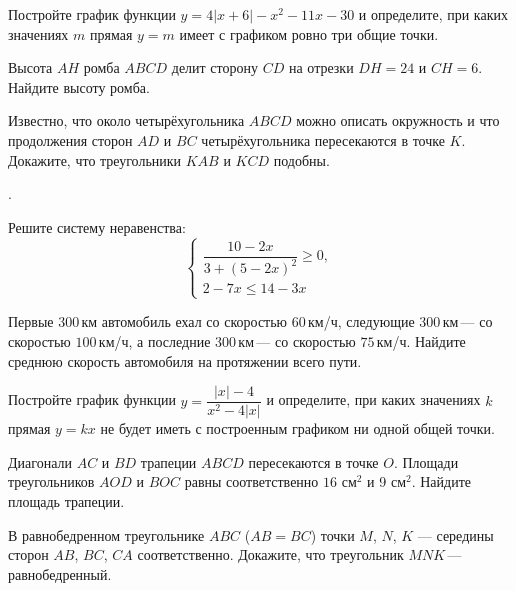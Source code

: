 \begin{class}[number=5]
\begin{listofex}
		\item Постройте график функции \( y=4|x+6|-x^2-11x-30 \) и определите, при каких значениях \( m \)	прямая \( y=m \) имеет с графиком ровно три общие точки.
		\item Высота \( AH \) ромба \( ABCD \) делит сторону \( CD \) на отрезки \( DH=24 \) и \( CH=6 \). Найдите высоту ромба.
		\item Известно, что около четырёхугольника \( ABCD \) можно описать окружность и что продолжения сторон \( AD \) и \( BC \) четырёхугольника пересекаются в точке \( K \). Докажите, что треугольники \( KAB \) и \( KCD \) подобны.
	\end{listofex}
\end{class}

\begin{class}[number=6]
	\begin{listofex}
		\item .
	\end{listofex}
\end{class}

\begin{homework}[number=3]
	\begin{listofex}
		\item Решите систему неравенства:
		\[\begin{cases} \dfrac{10-2x}{3+(5-2x)^2}\ge0,\\2-7x\le14-3x \end{cases}\]
		\item Первые \( 300 \) км автомобиль ехал со скоростью \( 60 \) км/ч, следующие \( 300 \) км --- со скоростью \( 100 \) км/ч, а последние \( 300 \) км --- со скоростью \( 75 \) км/ч. Найдите среднюю скорость автомобиля на протяжении всего пути.
		\item Постройте график функции \( y=\dfrac{|x|-4}{x^2-4|x|} \) и определите, при каких значениях \( k \) прямая \( y=kx \) не будет иметь с построенным графиком ни одной общей точки.
		\item Диагонали \( AC \) и \( BD \) трапеции \( ABCD \) пересекаются в точке \( O \). Площади треугольников \( AOD \) и \( BOC \) равны соответственно \( 16 \) см\( ^2 \)  и 9 см\( ^2 \). Найдите площадь трапеции.
		\item В равнобедренном треугольнике \( ABC \) (\( AB=BC \)) точки \( M \), \( N \), \( K \) --- середины сторон \( AB \), \( BC \), \( CA \) соответственно. Докажите, что треугольник \( MNK \) --- равнобедренный.
	\end{listofex}
\end{homework}

